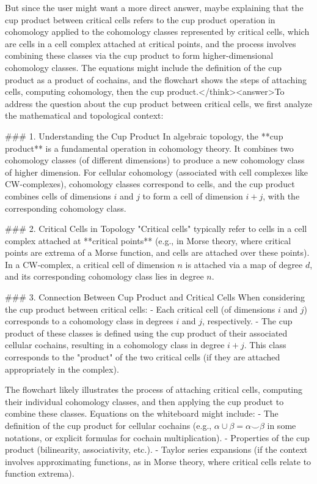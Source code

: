 But since the user might want a more direct answer, maybe explaining that the cup product between critical cells refers to the cup product operation in cohomology applied to the cohomology classes represented by critical cells, which are cells in a cell complex attached at critical points, and the process involves combining these classes via the cup product to form higher-dimensional cohomology classes. The equations might include the definition of the cup product as a product of cochains, and the flowchart shows the steps of attaching cells, computing cohomology, then the cup product.</think><answer>To address the question about the cup product between critical cells, we first analyze the mathematical and topological context:  

### 1. Understanding the Cup Product  
In algebraic topology, the **cup product** is a fundamental operation in cohomology theory. It combines two cohomology classes (of different dimensions) to produce a new cohomology class of higher dimension. For cellular cohomology (associated with cell complexes like CW-complexes), cohomology classes correspond to cells, and the cup product combines cells of dimensions \( i \) and \( j \) to form a cell of dimension \( i + j \), with the corresponding cohomology class.  


### 2. Critical Cells in Topology  
"Critical cells" typically refer to cells in a cell complex attached at **critical points** (e.g., in Morse theory, where critical points are extrema of a Morse function, and cells are attached over these points). In a CW-complex, a critical cell of dimension \( n \) is attached via a map of degree \( d \), and its corresponding cohomology class lies in degree \( n \).  


### 3. Connection Between Cup Product and Critical Cells  
When considering the cup product between critical cells:  
- Each critical cell (of dimensions \( i \) and \( j \)) corresponds to a cohomology class in degrees \( i \) and \( j \), respectively.  
- The cup product of these classes is defined using the cup product of their associated cellular cochains, resulting in a cohomology class in degree \( i + j \). This class corresponds to the "product" of the two critical cells (if they are attached appropriately in the complex).  

The flowchart likely illustrates the process of attaching critical cells, computing their individual cohomology classes, and then applying the cup product to combine these classes. Equations on the whiteboard might include:  
- The definition of the cup product for cellular cochains (e.g., \( \alpha \cup \beta = \alpha \smile \beta \) in some notations, or explicit formulas for cochain multiplication).  
- Properties of the cup product (bilinearity, associativity, etc.).  
- Taylor series expansions (if the context involves approximating functions, as in Morse theory, where critical cells relate to function extrema).  


